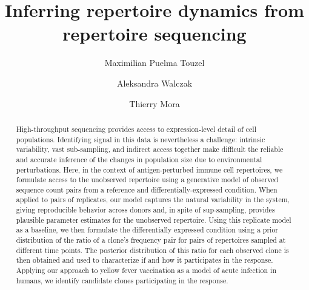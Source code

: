 \documentclass[letterpaper,english,prl,reprint,longbibliography]{revtex4-1} %
\begin{document}

\title{Inferring repertoire dynamics from repertoire sequencing}

\author{Maximilian Puelma Touzel}


\author{Aleksandra Walczak}


\author{Thierry Mora}


\vspace{0.5cm}

\begin{abstract}
High-throughput sequencing provides access to expression-level detail of cell populations. Identifying signal in this data is nevertheless a challenge: intrinsic variability, vast sub-sampling, and indirect access together make difficult the reliable and accurate inference of the changes in population size due to environmental perturbations. Here, in the context of antigen-perturbed immune cell repertoires, we formulate access to the unobserved repertoire using a generative model of observed sequence count pairs from a reference and differentially-expressed condition. When applied to pairs of replicates, our model captures the natural variability in the system, giving reproducible behavior across donors and, in spite of sup-sampling, provides plausible parameter estimates for the unobserved repertoire. Using this replicate model as a baseline, we then formulate the differentially expressed condition using a prior distribution of the ratio of a clone’s frequency pair for pairs of repertoires sampled at different time points. The posterior distribution of this ratio for each observed clone is then obtained and used to characterize if and how it participates in the response. Applying our approach to yellow fever vaccination as a model of acute infection in humans, we identify candidate clones participating in the response.   

\end{abstract}


\pacs{}
\end{document}
